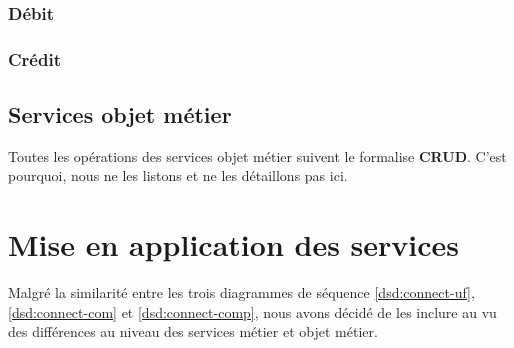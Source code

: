 \subsubsection{Débit}

\subsubsection{Crédit}


\subsection{Services objet métier}
Toutes les opérations des services objet métier suivent le formalise
\textbf{CRUD}. C'est pourquoi, nous ne les listons et ne les détaillons pas
ici. \\

\section{Mise en application des services}
Malgré la similarité entre les trois diagrammes de séquence
\ref{dsd:connect-uf}, \ref{dsd:connect-com} et \ref{dsd:connect-comp}, nous
avons décidé de les inclure au vu des différences au niveau des services métier
et objet métier.

